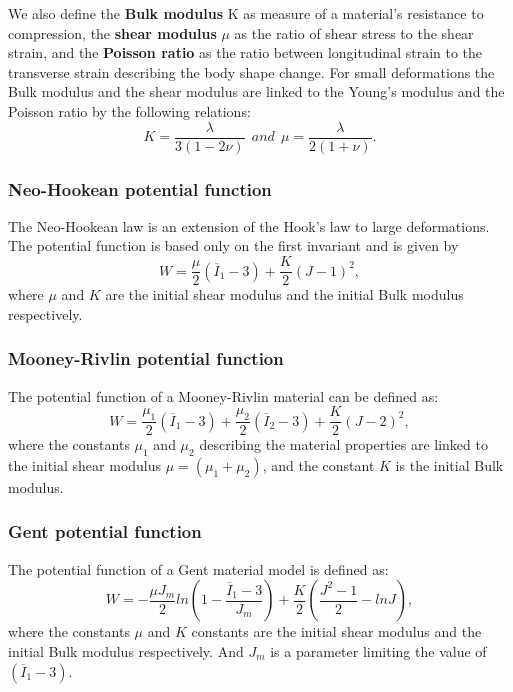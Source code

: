 We also define the \textbf{Bulk modulus} K  as measure of a material's resistance to compression, the \textbf{shear modulus} $\mu$ as the ratio of shear stress to the shear strain, and the \textbf{Poisson ratio}  as the ratio between longitudinal strain to the transverse strain describing the body shape change. For small deformations the Bulk modulus and the shear modulus are linked to the Young's modulus and the Poisson ratio by the following relations:
 \begin{equation} 
  K = \frac{\lambda}{3(1-2\nu)} \ \ and \ \ \mu = \frac{\lambda}{2(1+\nu)}.
\end{equation}
  
\subsubsection*{Neo-Hookean potential function}
The Neo-Hookean \citep{treloar_elasticity_1943} law is an extension of the Hook's law to large deformations. The potential function is based only on the first invariant and is given by 
\begin{equation}
\label{eq:Neo-Hookmodel}
W =\frac{\mu}{2} (\overline{I}_1-3) + \frac{K}{2}(J-1)^2,
\end{equation}
where $\mu$ and $K$ are the initial shear modulus and the initial Bulk modulus respectively. 
\subsubsection*{Mooney-Rivlin potential function}
The potential function of a Mooney-Rivlin \citep{rivlin_large_1951} material can be defined as:
\begin{equation}
\label{eq:mooneyRivlingmodel}
W=\frac{\mu_1}{2}(\overline{I}_1-3)+\frac{\mu_2}{2}(\overline{I}_2-3)+\frac{K}{2}(J-2)^2,
\end{equation}
where the constants $\mu_1$ and $\mu_2$ describing the material properties are linked to the initial shear modulus $\mu = (\mu_1+\mu_2)$, and the constant $K$ is the initial Bulk modulus. 

\subsubsection*{Gent potential function}
The potential function of a Gent \citep{gent_forms_1958} material model is defined as:
\begin{equation}
\label{gentmodel}
W=-\frac{\mu J_m}{2}ln\left(1-\frac{\overline{I}_1-3}{J_m}\right)+\frac{K}{2}\left(\frac{J^2-1}{2}-lnJ\right),
\end{equation}
 where the constants $\mu$ and $K$ constants are the initial shear modulus and the initial Bulk modulus respectively. And $J_m$ is a parameter limiting the value of $(\overline{I}_1-3).$

